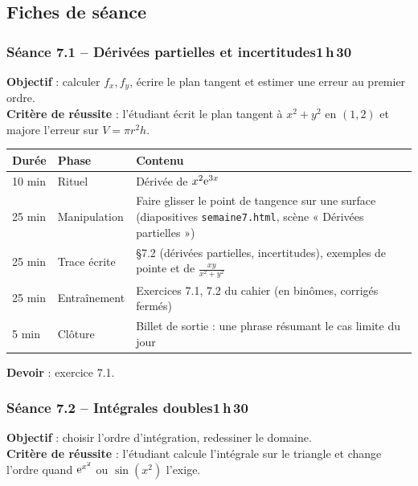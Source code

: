 \documentclass[10.5pt,a4paper]{article}
\newif\ifprof
\newcommand{\profonly}[1]{\ifprof #1\fi}
\begin{document}
\subsection{Fiches de séance}
\subsubsection*{\textcolor{marine}{Séance 7.1 -- Dérivées partielles et incertitudes}\hfill\normalfont\small\textcolor{ardoise}{1\,h\,30}}
\begin{objectif}\textbf{Objectif} : calculer $f_x,f_y$, écrire le plan tangent et estimer une erreur au premier ordre.\\\textbf{Critère de réussite} : l'étudiant écrit le plan tangent à $x^2+y^2$ en $(1,2)$ et majore l'erreur sur $V=\pi r^2h$.\end{objectif}\nopagebreak
\begin{longtable}{@{}p{1.1cm}p{2.4cm}p{12.4cm}@{}}
\toprule \textbf{Durée} & \textbf{Phase} & \textbf{Contenu}\\ \midrule\endhead
10 min & Rituel & Dérivée de $x^2\mathrm{e}^{3x}$\\
25 min & Manipulation & Faire glisser le point de tangence sur une surface (diapositives \texttt{semaine7.html}, scène « Dérivées partielles »)\\
25 min & Trace écrite & \S7.2 (dérivées partielles, incertitudes), exemples de pointe et de $\frac{xy}{x^2+y^2}$\\
25 min & Entraînement & Exercices 7.1, 7.2 du cahier (en binômes, corrigés fermés)\\
5 min & Clôture & Billet de sortie : une phrase résumant le cas limite du jour\\ \bottomrule\end{longtable}\nopagebreak
\textbf{Devoir} : exercice 7.1.\profonly{ \textbf{Point de vigilance} : $f_x,f_y$ existantes ne garantissent ni continuité ni plan tangent.}\par
{}\subsubsection*{\textcolor{marine}{Séance 7.2 -- Intégrales doubles}\hfill\normalfont\small\textcolor{ardoise}{1\,h\,30}}
\begin{objectif}\textbf{Objectif} : choisir l'ordre d'intégration, redessiner le domaine.\\\textbf{Critère de réussite} : l'étudiant calcule l'intégrale sur le triangle et change l'ordre quand $\mathrm{e}^{x^2}$ ou $\sin(x^2)$ l'exige.\end{objectif}\nopagebreak
\end{document}
